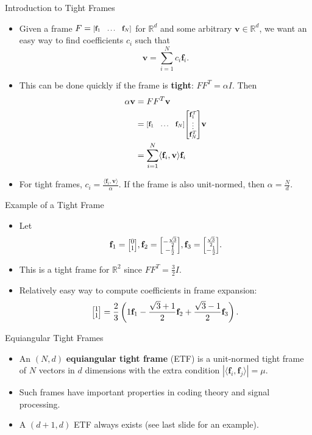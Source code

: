 \documentclass{beamer}
\newcommand{\RR}{\mathbb{R}}
\renewcommand{\vec}[1]{\mathbf{#1}}
\newcommand{\ivec}[2][.8]{%
  \scalebox{#1}{%
    \renewcommand{\arraystretch}{.8}%
    $\begin{bmatrix}#2\end{bmatrix}$%
  }
}
\begin{document}
{
\usebackgroundtemplate{}
\begin{frame}{Introduction to Tight Frames}
  \begin{itemize}
    \item <1-> Given a frame $F = \ivec{\vec{f}_1 & \ldots & \vec{f}_N}$ for $\RR^d$ and some arbitrary $\vec{v}\in\RR^d$, we want an easy way to find coefficients $c_i$ such that
    \[
        \vec{v} = \sum_{i=1}^{N}c_i\vec{f}_i.
    \]
    \item <2-> This can be done quickly if the frame is \textbf{tight}: $FF^{T} = \alpha I$.
    Then
    \begin{align*}
        \alpha\vec{v}
        &= FF^{T}\vec{v} \\
        &= \ivec{\vec{f}_1 & \ldots & \vec{f}_N}\ivec{\vec{f}_1^T \\ \vdots \\ \vec{f}_N^T}\vec{v} \\
        &= \sum_{i=1}^{N}\langle\vec{f}_i,\vec{v}\rangle\vec{f}_i
    \end{align*}
    \item <3-> For tight frames, $c_i = \frac{\langle\vec{f}_i,\vec{v}\rangle}{\alpha}$.
    If the frame is also unit-normed, then $\alpha = \frac{N}{d}$.
  \end{itemize}
\end{frame}
}
\begin{frame}{Example of a Tight Frame}
  \begin{itemize}
    \item <1-> Let 
    \[
        \vec{f}_{1} = \ivec{0\\1},\vec{f}_{2} = \ivec{-\frac{\sqrt{3}}{2} \\ -\frac{1}{2}}, \vec{f}_{3} = \ivec{\frac{\sqrt{3}}{2} \\ -\frac{1}{2}}.
    \]

    \item <2-> This is a tight frame for $\RR^2$ since $FF^{T} = \frac{3}{2}I$.

    \item <3-> Relatively easy way to compute coefficients in frame expansion:
    \[
        \ivec{1 \\ 1} = \frac{2}{3}\left(1\vec{f}_1 -\frac{\sqrt{3}+1}{2}\vec{f}_2 + \frac{\sqrt{3}-1}{2}\vec{f}_3\right).
    \]
  \end{itemize}
\end{frame}

\begin{frame}{Equiangular Tight Frames}
  \begin{itemize}
    \item <1-> An $(N,d)$ \textbf{equiangular tight frame} (ETF) is a unit-normed tight frame of $N$ vectors  in $d$ dimensions with the extra condition $|\langle\vec{f}_i,\vec{f}_j\rangle| = \mu$.
    \item <2-> Such frames have important properties in coding theory and signal processing.\cite{SH1}
    \item <3-> A $(d+1,d)$ ETF always exists (see last slide for an example).
  \end{itemize}
\end{frame}
\end{document}
